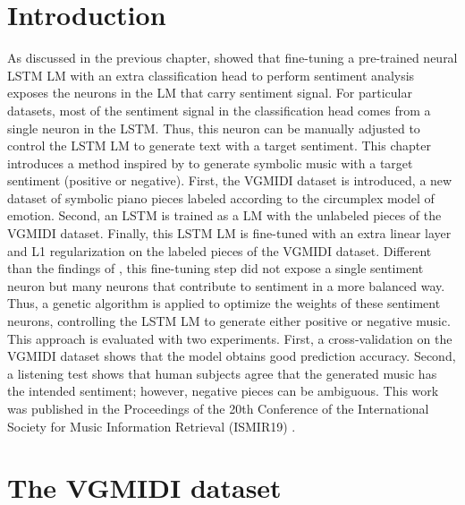 \section{Introduction}

As discussed in the previous chapter, \citet{radford_2017} showed that fine-tuning a pre-trained neural LSTM LM with an extra classification head to perform sentiment analysis exposes the neurons in the LM that carry sentiment signal. For particular datasets, most of the sentiment signal in the classification head comes from a single neuron in the LSTM. Thus, this neuron can be manually adjusted to control the LSTM LM to generate text with a target sentiment. This chapter introduces a method inspired by \citet{radford_2017} to generate symbolic music with a target sentiment (positive or negative). First, the VGMIDI dataset is introduced, a new dataset of symbolic piano pieces labeled according to the circumplex model of emotion. Second, an LSTM is trained as a LM with the unlabeled pieces of the VGMIDI dataset. Finally, this LSTM LM is fine-tuned with an extra linear layer and L1 regularization on the labeled pieces of the VGMIDI dataset. Different than the findings of \citet{radford_2017}, this fine-tuning step did not expose a single sentiment neuron but many neurons that contribute to sentiment in a more balanced way. Thus, a genetic algorithm is applied to optimize the weights of these sentiment neurons, controlling the LSTM LM to generate either positive or negative music. This approach is evaluated with two experiments. First, a cross-validation on the VGMIDI dataset shows that the model obtains good prediction accuracy. Second, a listening test shows that human subjects agree that the generated music has the intended sentiment; however, negative pieces can be ambiguous. This work was published in the Proceedings of the 20th Conference of the International Society for Music Information Retrieval (ISMIR19) \cite{ferreira_2019}.

\section{The VGMIDI dataset}

